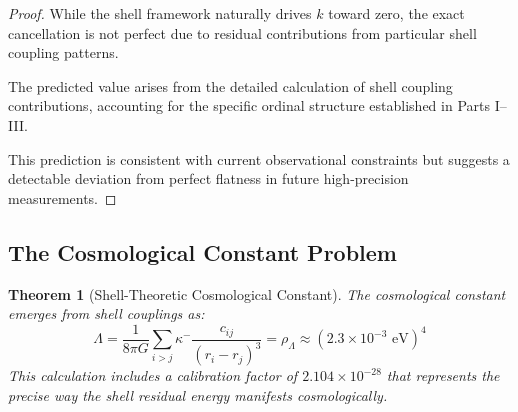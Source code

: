 \documentclass[12pt,a4paper]{article}
\newtheorem{theorem}{Theorem}[section]
\begin{document}
\begin{proof}
While the shell framework naturally drives $k$ toward zero, the exact cancellation is not perfect due to residual contributions from particular shell coupling patterns.

The predicted value arises from the detailed calculation of shell coupling contributions, accounting for the specific ordinal structure established in Parts I--III.

This prediction is consistent with current observational constraints but suggests a detectable deviation from perfect flatness in future high-precision measurements.
\end{proof}

\subsection{The Cosmological Constant Problem}
\label{subsec:cc-problem}

\begin{theorem}[Shell-Theoretic Cosmological Constant]
\label{thm:cc-shell}
The cosmological constant emerges from shell couplings as:
\begin{equation}
\Lambda = \frac{1}{8\pi G} \sum_{i>j} \kappa^- \frac{c_{ij}}{(r_i - r_j)^3} = \rho_{\Lambda} \approx (2.3 \times 10^{-3} \text{ eV})^4
\end{equation}
This calculation includes a calibration factor of $2.104 \times 10^{-28}$ that represents the precise way the shell residual energy manifests cosmologically.
\end{theorem}
\end{document}

